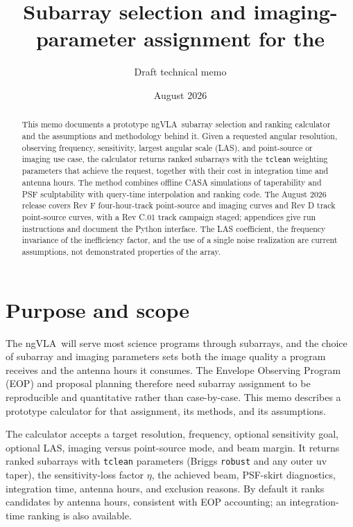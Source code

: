 \documentclass[11pt]{article}
\title{Subarray selection and imaging-parameter assignment for the \ngvla}
\author{Draft technical memo}
\date{August 2026}
\newcommand{\ngvla}{ngVLA}
\begin{document}
\maketitle

\begin{abstract}
This memo documents a prototype \ngvla\ subarray selection and ranking
calculator and the assumptions and methodology behind it.  Given a requested
angular resolution, observing frequency, sensitivity, largest angular scale
(LAS), and point-source or imaging use case, the calculator returns ranked
subarrays with the \texttt{tclean} weighting parameters that achieve the
request, together with their cost in integration time and antenna hours.
The method combines offline CASA simulations of taperability and PSF
sculptability with query-time interpolation and ranking code.  The
August 2026 release covers Rev F four-hour-track point-source and imaging
curves and Rev D track point-source curves, with a Rev C.01 track campaign
staged; appendices give run instructions and document the Python
interface.  The LAS coefficient, the frequency
invariance of the inefficiency factor, and the use of a single noise
realization are current assumptions, not demonstrated properties of the
array.
\end{abstract}

\section{Purpose and scope}

The \ngvla\ will serve most science programs through subarrays, and the
choice of subarray and imaging parameters sets both the image quality a
program receives and the antenna hours it consumes.  The Envelope Observing
Program (EOP) and proposal planning therefore need subarray assignment to
be reproducible and quantitative rather than case-by-case.  This memo
describes a prototype calculator for that assignment, its methods, and its
assumptions.

The calculator accepts a target resolution, frequency, optional
sensitivity goal, optional LAS, imaging versus point-source mode, and beam
margin.  It returns ranked subarrays with \texttt{tclean} parameters
(Briggs \texttt{robust} and any outer uv taper), the sensitivity-loss
factor $\eta$, the achieved beam, PSF-skirt diagnostics, integration time,
antenna hours, and exclusion reasons.  By default it ranks candidates by
antenna hours, consistent with EOP accounting; an integration-time
ranking is also available.
\end{document}
